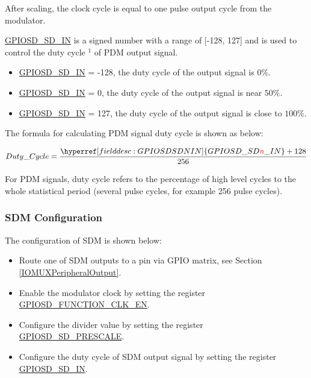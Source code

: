 \documentclass[main\_\_EN.tex]{subfiles}
\begin{document}
After scaling, the clock cycle is equal to one pulse output cycle from the modulator.

\hyperref[fielddesc:GPIOSDSDNIN]{GPIOSD\_SD\_IN} is a signed number with a range of [-128, 127] and is used to control the duty cycle $^{1}$ of PDM output signal.

\begin{itemize}
    \item \hyperref[fielddesc:GPIOSDSDNIN]{GPIOSD\_SD\_IN} = -128, the duty cycle of the output signal is \begin{math}0\% \end{math}.
    \item \hyperref[fielddesc:GPIOSDSDNIN]{GPIOSD\_SD\_IN} = 0, the duty cycle of the output signal is near \begin{math}50\% \end{math}.
    \item \hyperref[fielddesc:GPIOSDSDNIN]{GPIOSD\_SD\_IN} = 127, the duty cycle of the output signal is close to \begin{math}100\% \end{math}.
\end{itemize}

The formula for calculating PDM signal duty cycle is shown as below:

    \[
    Duty\_Cycle=\frac{\hyperref[fielddesc:GPIOSDSDNIN]{GPIOSD\_SD\regindex{n}\_IN} + 128} {256}
    \]
    
\begin{tiplisting}
For PDM signals, duty cycle refers to the percentage of high level cycles to the whole statistical period (several pulse cycles, for example 256 pulse cycles).
\end{tiplisting}

\subsubsection{SDM Configuration}

The configuration of SDM is shown below:

\begin{itemize}
    \item Route one of SDM outputs to a pin via GPIO matrix, see Section \ref{IOMUXPeripheralOutput}.
    \item Enable the modulator clock by setting the register \hyperref[fielddesc:GPIOSDFUNCTIONCLKEN]{GPIOSD\_FUNCTION\_CLK\_EN}.
    \item Configure the divider value by setting the register \hyperref[fielddesc:GPIOSDSDNPRESCALE]{GPIOSD\_SD\_PRESCALE}.
    \item Configure the duty cycle of SDM output signal by setting the register \hyperref[fielddesc:GPIOSDSDNIN]{GPIOSD\_SD\_IN}.
\end{itemize}
\end{document}
